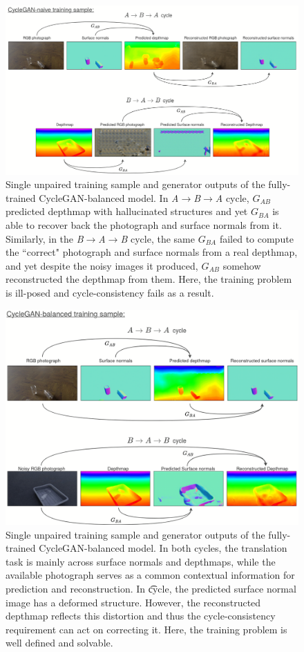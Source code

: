 \begin{figure}[h!]
    \centering
    \includegraphics[width=\linewidth]{figures/Expt_1/cyclegan_naive_cycles.png}
    \caption{Single unpaired training sample and generator outputs of the fully-trained CycleGAN-balanced model. In \textit{A}$\rightarrow$\textit{B}$\rightarrow$\textit{A} cycle, $G_{AB}$ predicted depthmap with hallucinated structures and yet $G_{BA}$ is able to recover back the photograph and surface normals from it. Similarly, in the \textit{B}$\rightarrow$\textit{A}$\rightarrow$\textit{B} cycle, the same $G_{BA}$ failed to compute the ``correct" photograph and surface normals from a real depthmap, and yet despite the noisy images it produced, $G_{AB}$ somehow reconstructed the depthmap from them. Here, the training problem is ill-posed and cycle-consistency fails as a result.}
    \label{fig:cleargrasp_cyclegan_naive_cycles}
\end{figure}

\begin{figure}[h!]
    \centering
    \includegraphics[width=0.8\linewidth]{figures/Expt_1/cyclegan_balanced_cycles.png}
    \caption{Single unpaired training sample and generator outputs of the fully-trained CycleGAN-balanced model. In both cycles, the translation task is mainly across surface normals and depthmaps, while the available photograph serves as a common contextual information for prediction and reconstruction. In \t cycle, the predicted surface normal image has a deformed structure. However, the reconstructed depthmap reflects this distortion and thus the cycle-consistency requirement can act on correcting it. Here, the training problem is well defined and solvable.}
    \label{fig:cleargrasp_cyclegan_balanced_cycles}
\end{figure}

